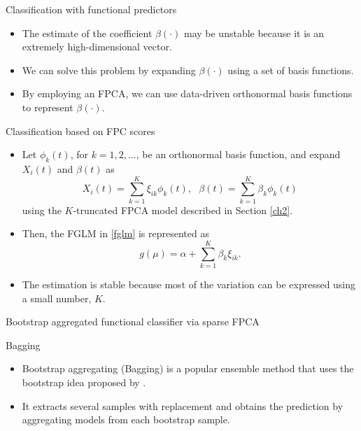 \documentclass{beamer}
\begin{document}
\begin{frame}{Classification with functional predictors}
	\begin{itemize}
		\item{
			The estimate of the coefficient $\beta(\cdot)$ may be unstable because it is an extremely high-dimensional vector.
		}
		\item{
			We can solve this problem by expanding $\beta(\cdot)$ using a set of basis functions. 
		}
		\item{
			By employing an FPCA, we can use data-driven orthonormal basis functions to represent $\beta(\cdot)$.
		}
	\end{itemize}
\end{frame}

\begin{frame}{Classification based on FPC scores}
	\begin{itemize}
		\item{
			Let $\phi_k(t)$, for $k=1, 2, \ldots$, be an orthonormal basis function, and expand $X_i(t)$ and $\beta(t)$ as
			$$X_i(t) = \sum_{k=1}^K \xi_{ik} \phi_k(t), ~~~  \beta(t) = \sum_{k=1}^K \beta_k \phi_k(t)$$
			using the $K$-truncated FPCA model described in Section \ref{ch2}.
		}
		\item{
			Then, the FGLM in \eqref{fglm}
			 is represented as
			\begin{equation*}
			g(\mu) = \alpha + \sum_{k=1}^K \beta_k \xi_{ik}.
			\end{equation*}
		}
		\item{
			The estimation is stable because most of the variation can be expressed using a small number, $K$.
		}
	\end{itemize}
\end{frame}


\begin{frame}{Bootstrap aggregated functional classifier via sparse FPCA}
	\begin{block}{Bagging}
		\begin{itemize}
			\item{
				Bootstrap aggregating (Bagging) is a popular ensemble method that uses the bootstrap idea proposed by \cite{Breiman1996}.
			}
			\item{
				It extracts several samples with replacement and obtains the prediction by aggregating models from each bootstrap sample.
			}
		\end{itemize}
	\end{block}
\end{frame}
\end{document}
